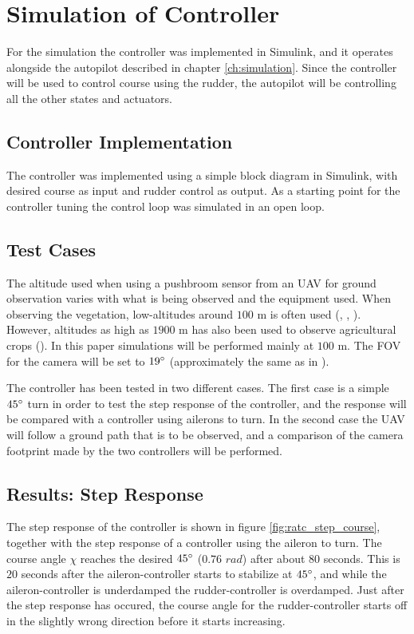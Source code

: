 \section{Simulation of Controller}

For the simulation the controller was implemented in Simulink, and it operates alongside the autopilot described in chapter \ref{ch:simulation}. Since the controller will be used to control course using the rudder, the autopilot will be controlling all the other states and actuators.


\subsection{Controller Implementation}

The controller was implemented using a simple block diagram in Simulink, with desired course as input and rudder control as output. As a starting point for the controller tuning the control loop was simulated in an open loop. 

\subsection{Test Cases}


The altitude used when using a pushbroom sensor from an UAV for ground observation varies with what is being observed and the equipment used. When observing the vegetation, low-altitudes around $100$ m is often used (\cite{hymsySUOMALAINEN}, \cite{wheatLELONG}, \cite{lowRAMIREZ}). However, altitudes as high as $1900$ m has also been used to observe agricultural crops (\cite{mosaicASMAT}). In this paper simulations will be performed mainly at $100$ m. The FOV for the camera will be set to $19\degree$ (approximately the same as in \cite{hymsySUOMALAINEN}).

The controller has been tested in two different cases. The first case is a simple $45\degree$ turn in order to test the step response of the controller, and the response will be compared with a controller using ailerons to turn. In the second case the UAV will follow a ground path that is to be observed, and a comparison of the camera footprint made by the two controllers will be performed.


\subsection{Results: Step Response}

The step response of the controller is shown in figure \ref{fig:ratc_step_course}, together with the step response of a controller using the aileron to turn. The course angle $\chi$ reaches the desired $45\degree$ ($0.76$ $rad$) after about $80$ seconds. This is $20$ seconds after the aileron-controller starts to stabilize at $45\degree$, and while the aileron-controller is underdamped the rudder-controller is overdamped. Just after the step response has occured, the course angle for the rudder-controller starts off in the slightly wrong direction before it starts increasing.

